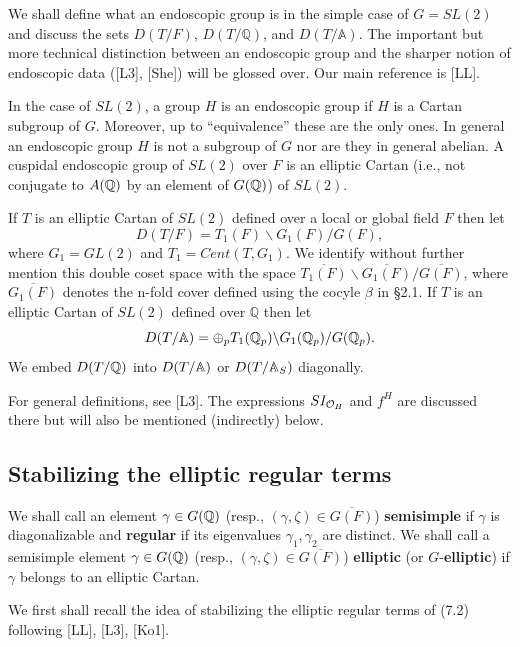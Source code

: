 We shall define what an endoscopic group is in the simple case
of $G=SL(2)$ and discuss the sets $D(T/F)$, $D(T/{\mathbb Q})$,
and $D(T/{\mathbb A})$. The important but more technical distinction
between an endoscopic group and the sharper notion of
endoscopic data ([L3], [She]) will be glossed over.
Our main reference is [LL].

In the case of $SL(2)$, a group $H$ is an endoscopic group
if $H$ is a Cartan subgroup of $G$. Moreover, up to ``equivalence''
these are the only ones. In general an endoscopic group $H$
is not a subgroup of $G$ nor are they in general abelian. A
cuspidal endoscopic group of $SL(2)$ over $F$
is an elliptic Cartan (i.e., not conjugate to $A(\mathbb{Q} )$ by an
element of $G(\mathbb{Q} )$) of $SL(2)$. 

If $T$ is an elliptic Cartan of $SL(2)$ defined over
a local or global field $F$ then let
\begin{equation}
D(T/F)=T_1(F)\backslash G_1(F)/G(F),
\end{equation}
where $G_1=GL(2)$ and $T_1=Cent(T,G_1)$.
We identify without further mention this double coset space with the
space
$\overline{T_1(F)}\backslash \overline{G_1(F)}/ \overline{G(F)}$,
where $\overline{G_1(F)}$ denotes the n-fold cover defined using the
cocyle $\beta$ in \S 2.1.
If $T$ is an elliptic Cartan of $SL(2)$ defined over
${\mathbb Q}$ then let
\begin{equation}
D(T/\mathbb{A} )
=\oplus_p T_1(\mathbb{Q} _p)\backslash G_1(\mathbb{Q} _p)/G(\mathbb{Q} _p).
\end{equation}
We embed $D(T/\mathbb{Q} )$ into $D(T/\mathbb{A} )$
or $D(T/\mathbb{A} _S)$ diagonally.

For general definitions, see [L3].
The expressions $SI_{{\cal{O}}_H}$ and $f^H$ are discussed there but
will also be mentioned (indirectly) below.

\subsection{Stabilizing the elliptic regular terms}

We shall call an element
$\gamma\in G(\mathbb{Q} )$ (resp.,
$(\gamma,\zeta) \in \overline{G(F)}$) \textbf{semisimple} if $\gamma $ is
diagonalizable and {\bf regular} if its eigenvalues
$\gamma_1,\gamma_2$ are distinct.
We shall call a semisimple element
$\gamma \in G(\mathbb{Q} )$
(resp., $(\gamma,\zeta) \in \overline{G(F)}$) \textbf{elliptic}
(or $G$-\textbf{elliptic}) if $\gamma $ belongs to
an elliptic Cartan.

We first shall recall the idea of stabilizing the elliptic regular terms of
(7.2) following [LL], [L3], [Ko1].

